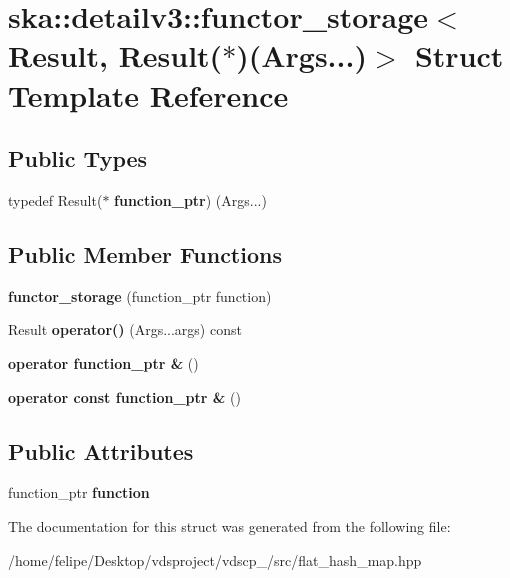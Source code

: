 \section{ska\+:\+:detailv3\+:\+:functor\+\_\+storage$<$ Result, Result($\ast$)(Args...)$>$ Struct Template Reference}
\label{structska_1_1detailv3_1_1functor__storage_3_01Result_00_01Result_07_5_08_07Args_8_8_8_08_4}
\subsection*{Public Types}
\begin{DoxyCompactItemize}
\item 
typedef Result($\ast$ {\bfseries function\+\_\+ptr}) (Args...)\label{structska_1_1detailv3_1_1functor__storage_3_01Result_00_01Result_07_5_08_07Args_8_8_8_08_4_a59181fac378d8220ef1cdb364d8cbc52}

\end{DoxyCompactItemize}
\subsection*{Public Member Functions}
\begin{DoxyCompactItemize}
\item 
{\bfseries functor\+\_\+storage} (function\+\_\+ptr function)\label{structska_1_1detailv3_1_1functor__storage_3_01Result_00_01Result_07_5_08_07Args_8_8_8_08_4_a975cd58296e05a0e1c231de3c34dfe01}

\item 
Result {\bfseries operator()} (Args...\+args) const \label{structska_1_1detailv3_1_1functor__storage_3_01Result_00_01Result_07_5_08_07Args_8_8_8_08_4_af76a0835878cf61fe98690df661f5b79}

\item 
{\bfseries operator function\+\_\+ptr \&} ()\label{structska_1_1detailv3_1_1functor__storage_3_01Result_00_01Result_07_5_08_07Args_8_8_8_08_4_a5fff6851ad46ba4b32856030d6ee8e31}

\item 
{\bfseries operator const function\+\_\+ptr \&} ()\label{structska_1_1detailv3_1_1functor__storage_3_01Result_00_01Result_07_5_08_07Args_8_8_8_08_4_abdf5e725c6a6b3c1f09ca3385fa7c553}

\end{DoxyCompactItemize}
\subsection*{Public Attributes}
\begin{DoxyCompactItemize}
\item 
function\+\_\+ptr {\bfseries function}\label{structska_1_1detailv3_1_1functor__storage_3_01Result_00_01Result_07_5_08_07Args_8_8_8_08_4_a84b9752fc57d45de4111134a580b72c1}

\end{DoxyCompactItemize}


The documentation for this struct was generated from the following file\+:\begin{DoxyCompactItemize}
\item 
/home/felipe/\+Desktop/vdsproject/vdscp\+\_/src/flat\+\_\+hash\+\_\+map.\+hpp\end{DoxyCompactItemize}

